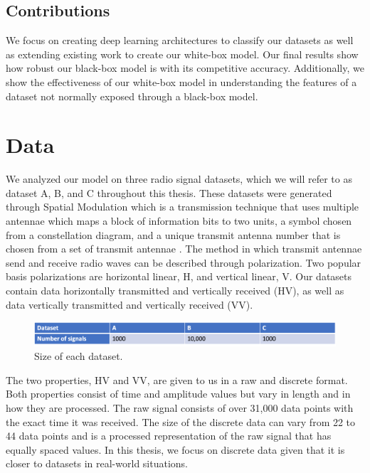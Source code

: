 \documentclass{turabian-thesis}
\begin{document}
\section{Contributions}
We focus on creating deep learning architectures to classify our datasets as well as extending existing work to create our white-box model. Our final results show how robust our black-box model is with its competitive accuracy. Additionally, we show the effectiveness of our white-box model in understanding the features of a dataset not normally exposed through a black-box model.


\chapter{Data}

We analyzed our model on three radio signal datasets, which we will refer to as dataset A, B, and C throughout this thesis. These datasets were generated through Spatial Modulation which is a transmission technique that uses multiple antennae which maps a block of information bits to two units, a symbol chosen from a constellation diagram, and a unique transmit antenna number that is chosen from a set of transmit antennae \cite{mesleh_spatial_2008}. The method in which transmit antennae send and receive radio waves can be described through polarization. Two popular basis polarizations are horizontal linear, H, and vertical linear, V. Our datasets contain data horizontally transmitted and vertically received (HV), as well as data vertically transmitted and vertically received (VV).

\begin{figure}[h!]
   \begin{center}
      \includegraphics[scale=0.5]{../media/dataset_info.png}
   \end{center}
   \caption{Size of each dataset.}
   \label{fig:stft_example}
\end{figure}

The two properties, HV and VV, are given to us in a raw and discrete format. Both properties consist of time and amplitude values but vary in length and in how they are processed. The raw signal consists of over 31,000 data points with the exact time it was received. The size of the discrete data can vary from 22 to 44 data points and is a processed representation of the raw signal that has equally spaced values. In this thesis, we focus on discrete data given that it is closer to datasets in real-world situations.
\end{document}
